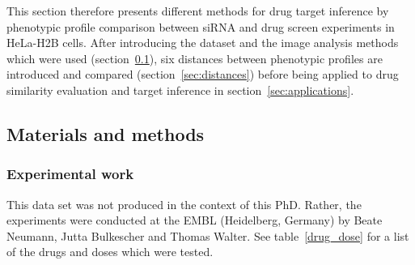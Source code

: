 This section therefore presents different methods for drug target inference by phenotypic profile comparison between siRNA and drug screen experiments in HeLa-H2B cells. After introducing the dataset and the image analysis methods which were used (section~\ref{sec:math_methods_ds}), six distances between phenotypic profiles are introduced and compared (section~\ref{sec:distances}) before being applied to drug similarity evaluation and target inference in section~\ref{sec:applications}.

\subsection{Materials and methods}
\label{sec:math_methods_ds}
\subsubsection{Experimental work}
This data set was not produced in the context of this PhD. Rather, the
experiments were conducted at the EMBL (Heidelberg, Germany) by Beate
Neumann, Jutta Bulkescher and Thomas Walter. See table~\ref{drug_dose} for a list of the drugs and doses which were tested.

